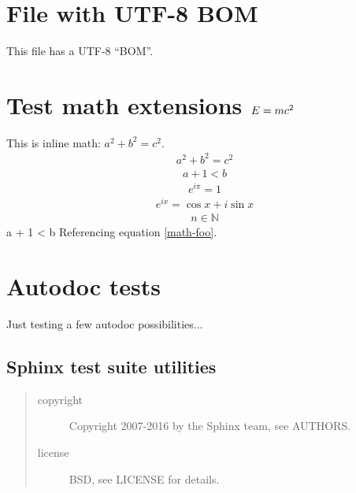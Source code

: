 \documentclass[letterpaper,10pt,english]{sphinxmanual}
\begin{document}
\chapter{File with UTF-8 BOM}
\label{bom::doc}\label{bom:file-with-utf-8-bom}
This file has a UTF-8 ``BOM''.


\chapter{Test math extensions \protect\(E = m c^2\protect\)}
\label{math:test-math-extensions}\label{math::doc}
This is inline math: \(a^2 + b^2 = c^2\).
\begin{equation*}
\begin{split}a^2 + b^2 = c^2\end{split}
\end{equation*}\begin{equation*}
\begin{split}a + 1 < b\end{split}
\end{equation*}\label{math:equation-foo}\begin{equation}\label{math-foo}
\begin{split}e^{i\pi} = 1\end{split}
\end{equation}\begin{equation*}
\begin{split}e^{ix} = \cos x + i\sin x\end{split}
\end{equation*}\begin{equation*}
\begin{split}n \in \mathbb N\end{split}
\end{equation*}a + 1 < b
Referencing equation \eqref{math-foo}.


\chapter{Autodoc tests}
\label{autodoc:autodoc-tests}\label{autodoc::doc}
Just testing a few autodoc possibilities...
\label{autodoc:module-util}

\section{Sphinx test suite utilities}
\label{autodoc:sphinx-test-suite-utilities}\begin{quote}\begin{description}
\item[{copyright}] \leavevmode
Copyright 2007-2016 by the Sphinx team, see AUTHORS.

\item[{license}] \leavevmode
BSD, see LICENSE for details.

\end{description}\end{quote}
\label{autodoc:module-test_autodoc}
\end{document}
